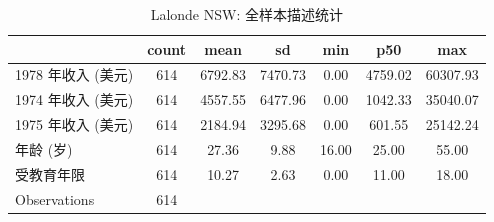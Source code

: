 \begin{table}[htbp]\centering
\def\sym#1{\ifmmode^{#1}\else\(^{#1}\)\fi}
\caption{Lalonde NSW: 全样本描述统计}
\begin{tabular}{l*{1}{cccccc}}
\toprule
                    &       count&        mean&          sd&         min&         p50&         max\\
\midrule
1978 年收入 (美元)  &         614&     6792.83&     7470.73&        0.00&     4759.02&    60307.93\\
1974 年收入 (美元)  &         614&     4557.55&     6477.96&        0.00&     1042.33&    35040.07\\
1975 年收入 (美元)  &         614&     2184.94&     3295.68&        0.00&      601.55&    25142.24\\
年龄 (岁)           &         614&       27.36&        9.88&       16.00&       25.00&       55.00\\
受教育年限          &         614&       10.27&        2.63&        0.00&       11.00&       18.00\\
\midrule
Observations        &         614&            &            &            &            &            \\
\bottomrule
\end{tabular}
\end{table}
